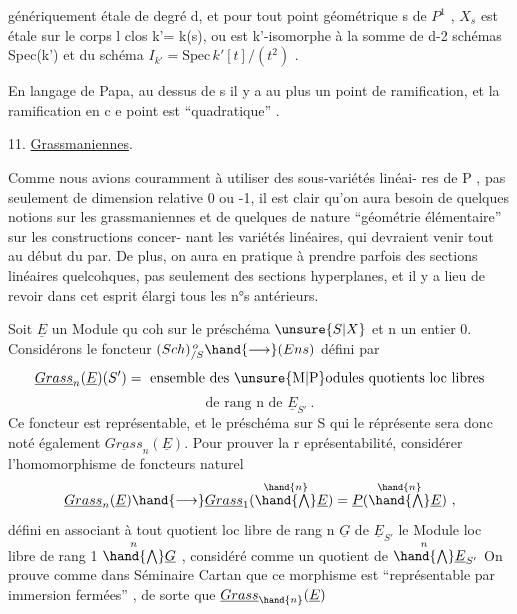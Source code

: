 
génériquement étale de degré d, et pour tout point géométrique  s de $P^1$ ,  $X_s$
est étale sur le corps \placedmargin{\unsure{$-$}}l clos k'= k(s), ou   est
k'-isomorphe à la somme de d-2  schémas Spec(k')   et   du schéma  
$I_{k'} = \mathrm{Spec}\, k'[t]/(t^2)$ .

En langage de Papa, au  dessus de s  il y a au plus un point de
ramification, et la ramification en c e point est ``quadratique'' .

11.  \uline{Grassmaniennes}.\placedmargin{\unsure{$\prime\,\prime$}}\placedmargin{\unsure{$\smile\,\smile$}} 

Comme nous avions couramment à utiliser des sous-variétés linéai-%
res de P , pas seulement de dimension relative 0 ou -1, il est clair
qu'on aura besoin de quelques notions sur les grassmaniennes  et de quelques
 de nature ``géométrie élémentaire'' sur les constructions concer-%
nant les variétés linéaires, qui  devraient venir tout au début du par.
De plus, on aura en pratique à prendre parfois des sections linéaires
quelcohques, pas seulement des sections hyperplanes, et il y a lieu de
revoir dans cet esprit élargi tous les n°s antérieurs.

Soit  $\underline{E}$  un Module qu coh  sur le préschéma $\unsure{S|X}$ et n un entier \hand{$>$} 0. Considérons le
foncteur \qquad $(Sch)_{/S}^{\,o} \hand{\longrightarrow} (Ens)$  défini par
\[ \underline{Grass}_n(\underline{E})(S') = \text{ ensemble des \unsure{M|P}odules quotients loc libres} \]
\[ \text{de rang  n  de } \underline{E}_{S'} \ . \]
Ce foncteur est représentable, et le préschéma sur S qui le réprésente
sera donc noté également $\underline{Grass}_n(\underline{E})$.  Pour prouver la r eprésentabilité,
considérer l'homomorphisme de foncteurs naturel
\[ \underline{Grass}_n(\underline{E}) \hand{\longrightarrow} \underline{Grass}_1( \overset{\hand{n}}{\textstyle\hand{\bigwedge}} \underline{E} ) = \underline{P} ( \overset{\hand{n}}{\textstyle\hand{\bigwedge}} \underline{E}) \ , \]
défini en associant à  tout  quotient loc libre  de rang n  $\underline{G}$  de $\underline{E}_{S'}$
le Module  loc libre de rang 1 \quad $\overset{n}{\textstyle\hand{\bigwedge}} \underline{G}$ , considéré comme un quotient
de  $\overset{n}{\textstyle\hand{\bigwedge}} \underline{E}_{S'}$   On prouve comme dans  Séminaire Cartan que  ce morphisme
est  ``représentable par  immersion fermées'' , de sorte que $\underline{Grass}_{\hand{n}}(\underline{E})$

